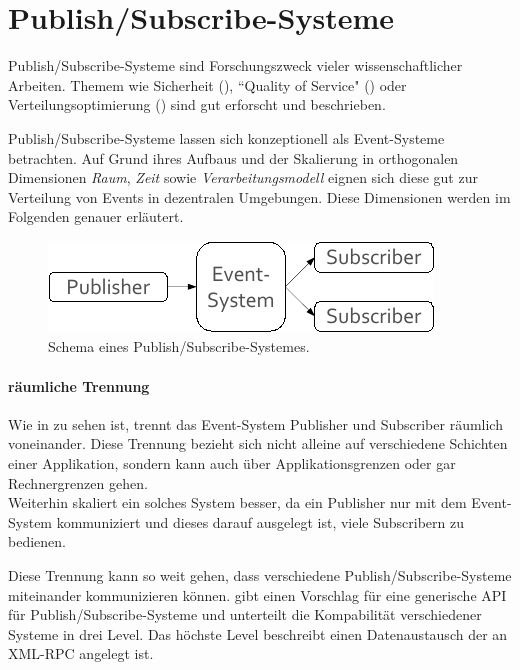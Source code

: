 \section{Publish/Subscribe-Systeme}
\label{chap:grundlagen:pubsub}
Publish/Subscribe-Systeme sind Forschungszweck vieler wissenschaftlicher Arbeiten\cite{Liu2003Survey, Banerjee2001Comparative}. Themem wie Sicherheit (\cite{FiegeSecurity}), ``Quality of Service" (\cite{BeFiMu2006PubSubQoS}) oder Verteilungsoptimierung (\cite{Muhl2002LargeScale, Castro2002Scribe}) sind gut erforscht und beschrieben.

Publish/Subscribe-Systeme lassen sich konzeptionell als Event-Systeme betrachten. Auf Grund ihres Aufbaus und der Skalierung  in orthogonalen Dimensionen \emph{Raum}, \emph{Zeit} sowie \emph{Verarbeitungsmodell} eignen sich diese gut zur Verteilung von Events in dezentralen Umgebungen\cite{PatrickTh2003Many}. Diese Dimensionen werden im Folgenden genauer erläutert.

\begin{figure}[htbp]
\centering
\includegraphics{grafics/pubsub_black_box.pdf}
\caption{Schema eines Publish/Subscribe-Systemes.}
\label{fig:pubsub_black_box}
\end{figure}

\paragraph{räumliche Trennung}
Wie in  zu sehen ist, trennt das Event-System Publisher und Subscriber räumlich voneinander. Diese Trennung bezieht sich nicht alleine auf verschiedene Schichten einer Applikation, sondern kann auch über Applikationsgrenzen oder gar Rechnergrenzen gehen. \\
Weiterhin skaliert ein solches System besser, da ein Publisher nur mit dem Event-System kommuniziert und dieses darauf ausgelegt ist, viele Subscribern zu bedienen.

Diese Trennung kann so weit gehen, dass verschiedene Publish/Subscribe-Systeme miteinander kommunizieren können. \cite{PiEyKoSh2007-PubSubAPI} gibt einen Vorschlag für eine generische API für Publish/Subscribe-Systeme und unterteilt die Kompabilität verschiedener Systeme in drei Level. Das höchste Level beschreibt einen Datenaustausch der an XML-RPC angelegt ist.

